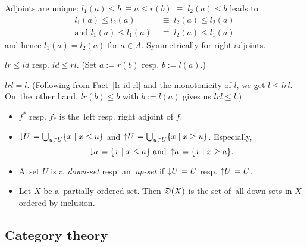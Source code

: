 \begin{rem}
  Adjoints are unique: $l_1(a) \le b \; \equiv a \le r(b) \; \equiv \; l_2(a)
  \le b$ leads to
  \begin{align*}
    l_1(a) \le l_2(a) \; &\equiv \; l_2(a) \le l_2(a) \\
    \text{and } l_1(a) \le l_1(a) \; &\equiv \; l_2(a) \le l_1(a)
  \end{align*}
  and hence $l_1(a) = l_2(a)$ for $a\in A$.
  Symmetrically for right adjoints.
\end{rem}

\begin{fact} \label{lr-id-rl}
  $lr \le id$ resp. $id \le rl$.
  (Set $a := r(b)$ resp. $b := l(a)$.)
\end{fact}

\begin{fact} \label{lrl=l}
  $lrl = l$.
  (Following from Fact~\ref{lr-id-rl} and the monotonicity of $l$, we get $l
   \le lrl$.
  On~the~other hand, $lr(b) \le b$ with $b := l(a)$ gives us $lrl \le l$.)
\end{fact}

\begin{itemize}
\item $f^*$ resp. $f_*$ is the~left resp. right adjoint of $f$.

\item $\left\downarrow U \right. = \bigcup_{u\in U} \{x \mid x \le u\}$ and
$\left\uparrow U \right. = \bigcup_{u\in U} \{x \mid x \ge u\}$.
Especially,
\[
  \left\downarrow a \right. = \{x \mid x \le a\} \text{ and } \left\uparrow a
  \right. = \{x \mid x \ge a\}.
\]

\item A~set $U$ is a~\emph{down-set\/} resp. an~\emph{up-set\/} if
$\left\downarrow U \right. = U$ resp. $\left\uparrow U \right. = U$.

\item Let $X$ be a~partially ordered set.
Then $\mathfrak{D}(X)$ is the set of~all down-sets in $X$ ordered by inclusion.

\end{itemize}

\subsection*{Category theory}

